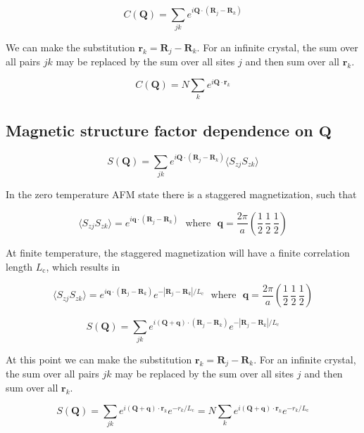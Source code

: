 \documentclass[11pt,letter]{article}
\newcommand{\bv}[1]{\ensuremath{\mathbf{#1}}}
\newcommand{\Lc}{\ensuremath{L_{\mathrm{c}}}}
\begin{document}
\begin{equation}
C(\bv{Q}) = \sum_{jk} e^{i \bv{Q} \cdot (\bv{R}_{j} - \bv{R}_{k} )} 
\end{equation}

We can make the substitution $\bv{r}_{k} = \bv{R}_{j} -
\bv{R}_{k}$.  For an infinite crystal, the sum over all pairs $jk$ may be replaced by the sum over all
sites $j$ and then sum over all $\bv{r}_{k}$.
 
\begin{equation}
C(\bv{Q}) = N\sum_{k} e^{i \bv{Q} \cdot \bv{r}_{k}} 
\end{equation}

\subsection{Magnetic structure factor dependence on \bv{Q}}

\begin{equation}
S(\bv{Q}) = \sum_{jk} e^{i \bv{Q} \cdot (\bv{R}_{j} - \bv{R}_{k} )} \langle S_{zj} S_{zk} \rangle
\end{equation}

In the zero temperature AFM state there is a staggered magnetization, such that 

\begin{equation}
\langle S_{zj}S_{zk} \rangle = e^{i \bv{q} \cdot (\bv{R}_{j} - \bv{R}_{k} )} 
\ \ \ \mathrm{where} \ \ \  
\bv{q} = \frac{2\pi}{a} \left( \frac{1}{2}\, \frac{1}{2}\, \frac{1}{2} \right)
\end{equation}

At finite temperature, the staggered magnetization will have a finite correlation length \Lc, which results in 

\begin{equation}
\langle S_{zj}S_{zk} \rangle = e^{i \bv{q} \cdot (\bv{R}_{j} - \bv{R}_{k} )} e^{-|\bv{R}_{j} -\bv{R}_{k} |/ \Lc }
 \ \ \ \mathrm{where} \ \ \   
\bv{q} = \frac{2\pi}{a} \left( \frac{1}{2}\, \frac{1}{2}\, \frac{1}{2} \right)
\end{equation}

\begin{equation}
S(\bv{Q}) = \sum_{jk} e^{i (\bv{Q} + \bv{q} )\cdot (\bv{R}_{j} - \bv{R}_{k} )} e^{-|\bv{R}_{j} -\bv{R}_{k} |/ \Lc }
\end{equation}

At this point we can make the substitution $\bv{r}_{k} = \bv{R}_{j} -
\bv{R}_{k}$.  For an infinite crystal, the sum over all pairs $jk$ may be replaced by the sum over all
sites $j$ and then sum over all $\bv{r}_{k}$. 

\begin{equation}
S(\bv{Q}) = \sum_{jk} e^{i (\bv{Q} + \bv{q} )\cdot \bv{r}_{k} } e^{-r_{k}/ \Lc } = N \sum_{k} e^{i (\bv{Q} + \bv{q} )\cdot \bv{r}_{k} } e^{-r_{k}/ \Lc }
\end{equation}
\end{document}
